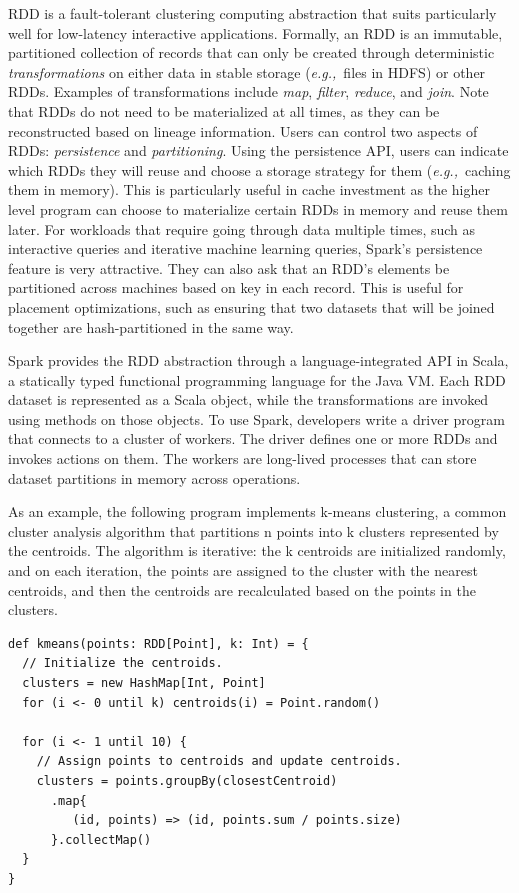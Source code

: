 \documentclass[preprint]{acm_proc_article-sp}
\newcommand{\eg}{{\em e.g.,}~}
\begin{document}
RDD is a fault-tolerant clustering computing abstraction that suits particularly well for low-latency interactive applications. Formally, an RDD is an immutable, partitioned collection of records that can only be created through deterministic \emph{transformations} on either data in stable storage (\eg files in HDFS) or other RDDs. Examples of transformations include \emph{map}, \emph{filter}, \emph{reduce}, and \emph{join}. Note that RDDs do not need to be materialized at all times, as they can be reconstructed based on lineage information. Users can control two aspects of RDDs: \emph{persistence} and \emph{partitioning}. Using the persistence API, users can indicate which RDDs they will reuse and choose a storage strategy for them (\eg caching them in memory). This is particularly useful in cache investment as the higher level program can choose to materialize certain RDDs in memory and reuse them later. For workloads that require going through data multiple times, such as interactive queries and iterative machine learning queries, Spark's persistence feature is very attractive. They can also ask that an RDD's elements be partitioned across machines based on key in each record. This is useful for placement optimizations, such as ensuring that two datasets that will be joined together are hash-partitioned in the same way.

Spark provides the RDD abstraction through a language-integrated API in Scala, a statically typed functional programming language for the Java VM. Each RDD dataset is represented as a Scala object, while the transformations are invoked using methods on those objects. To use Spark, developers write a driver program that connects to a cluster of workers. The driver defines one or more RDDs and invokes actions on them. The workers are long-lived processes that can store dataset partitions in memory across operations.

As an example, the following program implements k-means clustering, a common cluster analysis algorithm that partitions n points into k clusters represented by the centroids. The algorithm is iterative: the k centroids are initialized randomly, and on each iteration, the points are assigned to the cluster with the nearest centroids, and then the centroids are recalculated based on the points in the clusters. {\small
\begin{verbatim}
def kmeans(points: RDD[Point], k: Int) = {
  // Initialize the centroids.
  clusters = new HashMap[Int, Point]
  for (i <- 0 until k) centroids(i) = Point.random()

  for (i <- 1 until 10) {
    // Assign points to centroids and update centroids.
    clusters = points.groupBy(closestCentroid)
      .map{ 
         (id, points) => (id, points.sum / points.size)
      }.collectMap()
  }
}
\end{verbatim}
}
\end{document}
